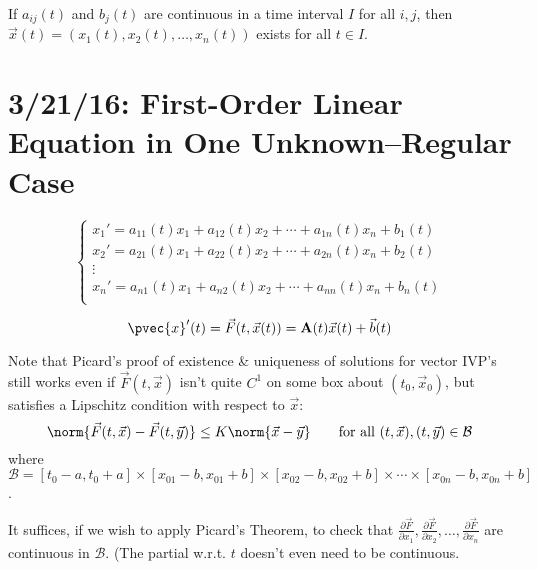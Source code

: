 \documentclass[12pt]{article}
\begin{document}
\begin{theorem}
If $a_{ij}(t)$ and $b_j(t)$ are continuous in a time interval $I$ for all $i,j$, then $\vec{x}(t) = (x_1(t),x_2(t),\dots,x_n(t))$ exists for all $t \in I$.
\end{theorem}

\section{3/21/16: First-Order Linear Equation in One Unknown--Regular Case}
\[ 
\begin{cases}
x_1' = a_{11}(t)x_1 + a_{12}(t)x_2 + \cdots + a_{1n}(t)x_n + b_1(t) \\
x_2' = a_{21}(t)x_1 + a_{22}(t)x_2 + \cdots + a_{2n}(t)x_n + b_2(t) \\
\vdots \\
x_n' = a_{n1}(t)x_1 + a_{n2}(t)x_2 + \cdots + a_{nn}(t)x_n + b_n(t) \\
\end{cases}
\]

\[ \pvec{x}'(t) = \vec{F}(t,\vec{x}(t)) = {\bf A}(t)\vec{x}(t) + \vec{b}(t) \]

Note that Picard's proof of existence \& uniqueness of solutions for vector IVP's still works even if $\vec{F}(t,\vec{x})$ isn't quite $C^1$ on some box about $(t_0, \vec{x}_0)$, but satisfies a Lipschitz condition with respect to $\vec{x}$:
\[ \norm{\vec{F}(t,\vec{x}) - \vec{F}(t,\vec{y})} \le K\norm{\vec{x} - \vec{y}} \qquad \text{for all } (t,\vec{x}), (t,\vec{y}) \in \mathcal{B} \]
where $\mathcal{B} = [t_0-a,t_0+a] \times [x_{01} - b,x_{01} + b] \times [x_{02} - b, x_{02} + b] \times \cdots \times [x_{0n} - b,x_{0n} + b]$.

It suffices, if we wish to apply Picard's Theorem, to check that $\frac{\partial \vec{F}}{\partial x_1},\frac{\partial \vec{F}}{\partial x_2},\dots,\frac{\partial \vec{F}}{\partial x_n}$ are continuous in $\mathcal{B}$. (The partial w.r.t. $t$ doesn't even need to be continuous.
\end{document}
